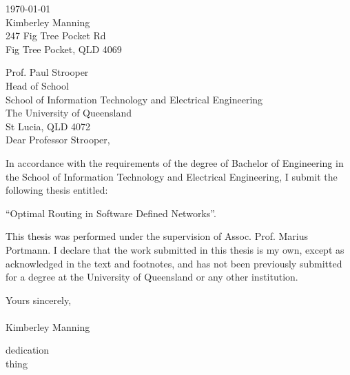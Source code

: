 \begin{flushright}
        \today\\
        Kimberley Manning\\
        247 Fig Tree Pocket Rd\\
        Fig Tree Pocket, QLD 4069\\
        \medskip

\end{flushright}
\begin{flushleft}
  Prof. Paul Strooper\\
  Head of School\\
  School of Information Technology and Electrical Engineering\\
  The University of Queensland\\
  St Lucia, QLD 4072\\
  \bigskip\bigskip
  Dear Professor Strooper,\\
\end{flushleft}
In accordance with the requirements of the degree of Bachelor of Engineering in the School of Information Technology and Electrical Engineering, I submit the following thesis entitled:
\begin{center}
        ``Optimal Routing in Software Defined Networks''.\\
\end{center}
This thesis was performed under the supervision of Assoc. Prof. Marius Portmann. I declare that the work submitted in this thesis is my own, except as acknowledged in the text and footnotes, and has not been previously submitted for a degree at the University of Queensland or any other institution.



\begin{flushleft}
        \medskip
        Yours sincerely,\\
        \bigskip
        \emph\\
        \bigskip
    Kimberley Manning
\end{flushleft}

\cleardoublepage
\vspace*{70mm}
\begin{center}
\renewcommand{\baselinestretch}{1.0}
\sl


dedication \\
thing


\end{center}

